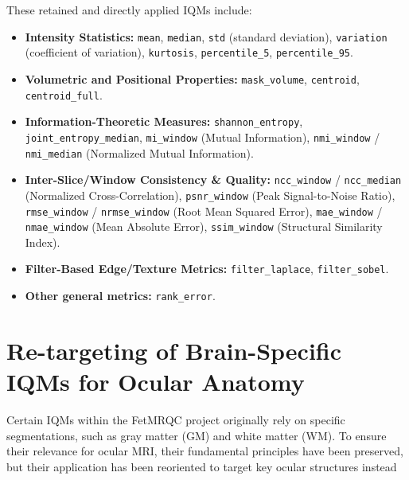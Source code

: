 These retained and directly applied IQMs include:
\begin{itemize}
    \item \textbf{Intensity Statistics:} \texttt{mean}, \texttt{median}, \texttt{std} (standard deviation), \texttt{variation} (coefficient of variation), \texttt{kurtosis}, \texttt{percentile\_5}, \texttt{percentile\_95}.
    \item \textbf{Volumetric and Positional Properties:} \texttt{mask\_volume}, \texttt{centroid}, \texttt{centroid\_full}.
    \item \textbf{Information-Theoretic Measures:} \texttt{shannon\_entropy}, \texttt{joint\_entropy\_median}, \texttt{mi\_window} (Mutual Information), \texttt{nmi\_window} / \texttt{nmi\_median} (Normalized Mutual Information).
    \item \textbf{Inter-Slice/Window Consistency \& Quality:} \texttt{ncc\_window} / \texttt{ncc\_median} (Normalized Cross-Correlation), \texttt{psnr\_window} (Peak Signal-to-Noise Ratio), \texttt{rmse\_window} / \texttt{nrmse\_window} (Root Mean Squared Error), \texttt{mae\_window} / \texttt{nmae\_window} (Mean Absolute Error), \texttt{ssim\_window} (Structural Similarity Index).
    \item \textbf{Filter-Based Edge/Texture Metrics:} \texttt{filter\_laplace}, \texttt{filter\_sobel}.
    \item \textbf{Other general metrics:} \texttt{rank\_error}.
\end{itemize}

\section{Re-targeting of Brain-Specific IQMs for Ocular Anatomy}
\label{sec:retargeting_iqms}

Certain IQMs within the FetMRQC project originally rely on specific segmentations, such as gray matter (GM) and white matter (WM). To ensure their relevance for ocular MRI, their fundamental principles have been preserved, but their application has been reoriented to target key ocular structures instead

